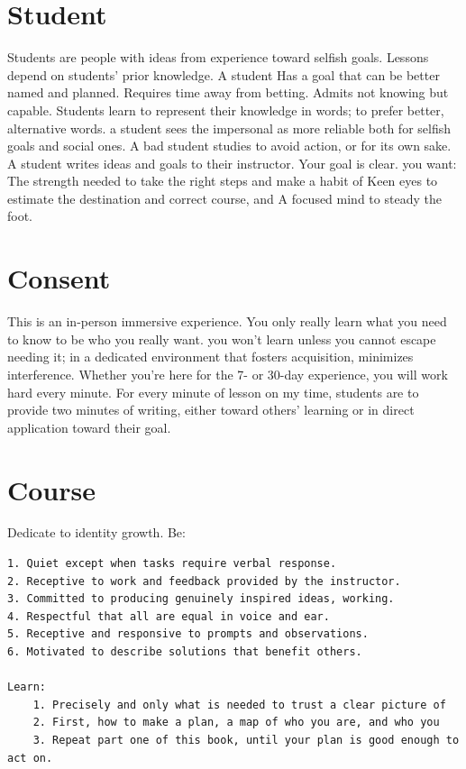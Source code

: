 \documentclass[
]{book}
\begin{document}
\section{Student}\label{student}

Students are people with ideas from experience toward selfish goals.
Lessons depend on students' prior knowledge.
A student
Has a goal that can be better named and planned.
Requires time away from betting.
Admits not knowing but capable.
Students learn to represent their knowledge in words; to prefer better, alternative words. a student sees the impersonal as more reliable both for selfish goals and social ones.
A bad student studies to avoid action, or for its own sake.
A student writes ideas and goals to their instructor.
Your goal is clear. you want:
The strength needed to take the right steps and make a habit of
Keen eyes to estimate the destination and correct course, and
A focused mind to steady the foot.

\section{Consent}\label{consent}

This is an in-person immersive experience.
You only really learn what you need to know to be who you really want. you won't learn unless you cannot escape needing it; in a dedicated environment that fosters acquisition, minimizes interference.
Whether you're here for the 7- or 30-day experience, you will work hard every minute.
For every minute of lesson on my time, students are to provide two minutes of writing, either toward others' learning or in direct application toward their goal.

\section{Course}\label{course}

Dedicate to identity growth. Be:

\begin{verbatim}
1. Quiet except when tasks require verbal response.
2. Receptive to work and feedback provided by the instructor.
3. Committed to producing genuinely inspired ideas, working.
4. Respectful that all are equal in voice and ear.
5. Receptive and responsive to prompts and observations.  
6. Motivated to describe solutions that benefit others.  

Learn:  
    1. Precisely and only what is needed to trust a clear picture of  
    2. First, how to make a plan, a map of who you are, and who you  
    3. Repeat part one of this book, until your plan is good enough to act on. 
\end{verbatim}
\end{document}
